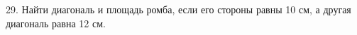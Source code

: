 29. Найти диагональ и площадь ромба, если его стороны равны 10 см, а другая диагональ равна 12 см.\\
